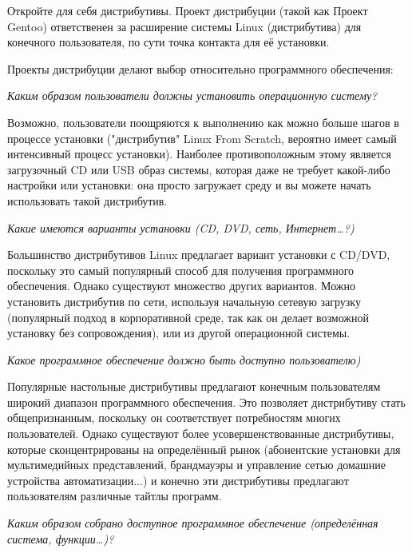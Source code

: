 \documentclass[12pt]{book}
\begin{document}
Откройте для себя дистрибутивы. Проект дистрибуции (такой как Проект Gentoo) ответственен за расширение системы Linux (дистрибутива) для конечного пользователя, по сути точка контакта для её установки.

Проекты дистрибуции делают выбор относительно программного обеспечения:

\begin{flushright}
{\color{gentoo}\emph{Каким образом пользователи должны установить операционную систему?}}
\end{flushright}


Возможно, пользователи поощряются к выполнению как можно больше шагов в  процессе установки ("дистрибутив" Linux From Scratch, вероятно имеет самый интенсивный процесс установки). Наиболее противоположным этому является загрузочный CD или USB образ системы, которая даже не требует какой-либо настройки или установки: она просто загружает среду и вы можете начать использовать такой дистрибутив.

\begin{flushright}
{\color{gentoo}\emph{Какие имеются варианты установки (CD, DVD, сеть, Интернет\ldots?)}}
\end{flushright}

Большинство дистрибутивов Linux предлагает вариант установки с CD/DVD, поскольку это самый популярный способ для получения программного обеспечения. Однако существуют множество других вариантов. Можно установить дистрибутив по сети, используя начальную сетевую загрузку (популярный подход в корпоративной среде, так как он делает возможной установку без сопровождения), или из другой операционной системы.

\begin{flushright}
{\color{gentoo}\emph{Какое программное обеспечение должно быть доступно пользователю)}}
\end{flushright}

Популярные настольные дистрибутивы предлагают конечным пользователям широкий диапазон программного обеспечения. Это позволяет дистрибутиву стать общепризнанным, поскольку он соответствует потребностям многих пользователей. Однако существуют более усовершенствованные дистрибутивы, которые сконцентрированы на определённый рынок (абонентские установки для мультимедийных представлений, брандмауэры и управление сетью домашние устройства автоматизации...) и конечно эти дистрибутивы предлагают пользователям различные тайтлы программ.

\begin{flushright}
{\color{gentoo}\emph{Каким образом собрано доступное программное обеспечение (определённая система, функции\ldots)?}}
\end{flushright}
\end{document}
